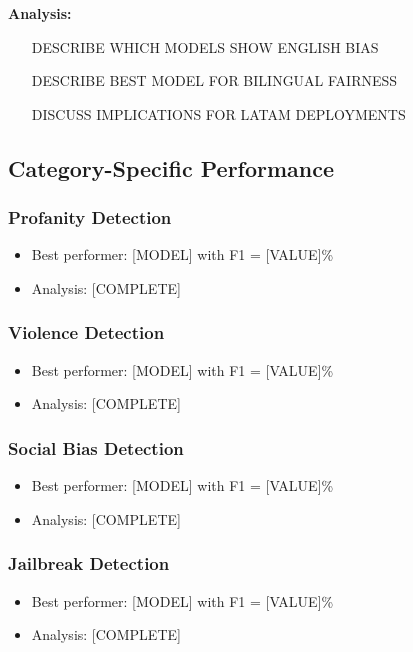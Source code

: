 \documentclass[11pt,a4paper]{article}
\begin{document}
\textbf{Analysis:}
\begin{itemize}
    \item [DESCRIBE WHICH MODELS SHOW ENGLISH BIAS]
    \item [DESCRIBE BEST MODEL FOR BILINGUAL FAIRNESS]
    \item [DISCUSS IMPLICATIONS FOR LATAM DEPLOYMENTS]
\end{itemize}

\subsection{Category-Specific Performance}

\subsubsection{Profanity Detection}
\begin{itemize}
    \item Best performer: [MODEL] with F1 = [VALUE]\%
    \item Analysis: [COMPLETE]
\end{itemize}

\subsubsection{Violence Detection}
\begin{itemize}
    \item Best performer: [MODEL] with F1 = [VALUE]\%
    \item Analysis: [COMPLETE]
\end{itemize}

\subsubsection{Social Bias Detection}
\begin{itemize}
    \item Best performer: [MODEL] with F1 = [VALUE]\%
    \item Analysis: [COMPLETE]
\end{itemize}

\subsubsection{Jailbreak Detection}
\begin{itemize}
    \item Best performer: [MODEL] with F1 = [VALUE]\%
    \item Analysis: [COMPLETE]
\end{itemize}
\end{document}
